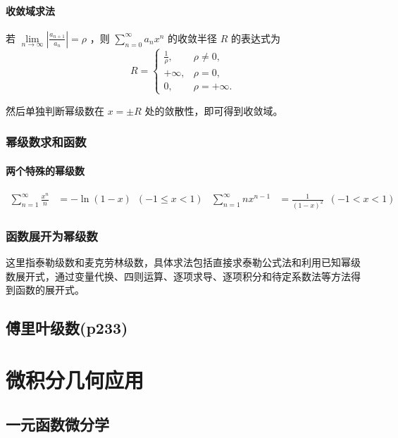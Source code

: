 ﻿\documentclass[a4paper,12pt,UTF8]{ctexart}
\begin{document}
    \paragraph{收敛域求法} 若 \(\lim \limits_{n \to \infty} \left| \frac{a_{n+1}}{a_{n}} \right| = \rho \) ，则 \(\sum \limits_{n=0}^{\infty}a_{n}x^{n}\) 的收敛半径 \(R\) 的表达式为
    \[R=\begin{cases}
        \frac{1}{\rho}, &\rho \neq 0,\\
        +\infty ,&\rho = 0,\\
        0 ,&\rho = +\infty.
    \end{cases} \]
    
    然后单独判断幂级数在 \(x=\pm R\) 处的敛散性，即可得到收敛域。

    \subsubsection{幂级数求和函数}
    
    \paragraph{两个特殊的幂级数}
    \begin{align*}
        \sum_{n=1}^{\infty}\frac{x^{n}}{n}&=-\ln (1-x) \enspace (-1 \leq  x < 1)&  \sum_{n=1}^{\infty} nx^{n-1}&=\frac{1}{(1-x)^{2}} \enspace (-1 < x < 1)&
    \end{align*}

    \subsubsection{函数展开为幂级数}
    这里指泰勒级数和麦克劳林级数，具体求法包括直接求泰勒公式法和利用已知幂级数展开式，通过变量代换、四则运算、逐项求导、逐项积分和待定系数法等方法得到函数的展开式。

    \subsection{傅里叶级数(p233)}

    \section{微积分几何应用}

    \subsection{一元函数微分学}
\end{document}
